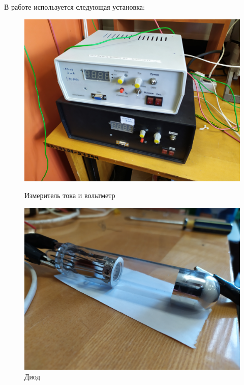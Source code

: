 \documentclass[a4paper]{article}
\begin{document}
В работе используется следующая установка:

\begin{figure}[h]
	\begin{center}
	\begin{minipage}[h]{0.45\linewidth}
	\includegraphics[width=1\linewidth]{p2.jpg}
	\caption{Измеритель тока и вольтметр} 
	\label{p2}
	\end{minipage}
	\hfill 
	\begin{minipage}[h]{0.45\linewidth}
	\includegraphics[width=1\linewidth]{p1.jpg}
	\caption{Диод}
	\label{p2}
	\end{minipage}
	\end{center}
\end{figure}
\end{document}
